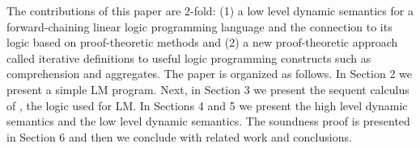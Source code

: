 The contributions of this paper are 2-fold: (1) a low level dynamic semantics
for a forward-chaining linear logic programming language and the connection to its
logic based on proof-theoretic methods and (2) a new proof-theoretic approach
called iterative definitions to useful logic programming constructs such as
comprehension and aggregates. The paper is organized as follows. In Section 2 we
present a simple LM program. Next, in Section 3 we present the sequent calculus of
\fragment, the logic used for LM. In Sections 4 and 5 we present the high
level dynamic semantics and the low level dynamic semantics. The soundness proof
is presented in Section 6 and then we conclude with related work and
conclusions.

